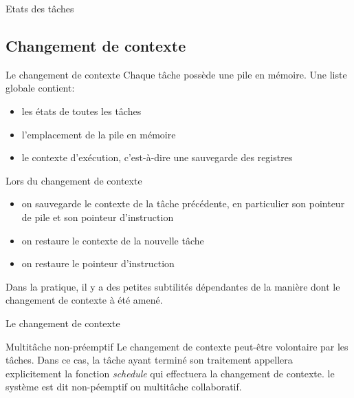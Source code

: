\begin{frame}{Etats des tâches}
  \begin{center}
    
  \end{center}
\end{frame}


\subsection{Changement de contexte}

\begin{frame}{Le changement de contexte}
  Chaque tâche possède une pile en mémoire. Une liste globale contient:
  \begin{itemize}
  \item les états de toutes les tâches
  \item l'emplacement de la pile en mémoire
  \item le contexte d'exécution, c'est-à-dire une sauvegarde des registres
  \end{itemize}
  Lors du changement de contexte
  \begin{itemize}
  \item  on  sauvegarde  le   contexte  de  la  tâche  précédente,  en
    particulier son pointeur de pile et son pointeur d'instruction
  \item on restaure le contexte de la nouvelle tâche
  \item on restaure le pointeur d'instruction
  \end{itemize}
  Dans la  pratique, il y a  des petites subtilités  dépendantes de la
  manière dont le changement de contexte à été amené.
\end{frame}

\begin{frame}{Le changement de contexte}
  \begin{center}
  \end{center}
\end{frame}

\begin{frame}{Multitâche non-préemptif}
  Le changement de contexte  peut-être volontaire par les tâches. Dans
  ce   cas,  la   tâche   ayant  terminé   son  traitement   appellera
  explicitement   la  fonction   \emph{schedule}   qui  effectuera   la
  changement  de   contexte.  le  système  est   dit  non-péemptif  ou
  multitâche collaboratif.
\end{frame}

